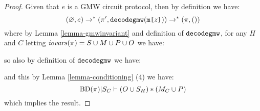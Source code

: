 \begin{proof}
  Given that $e$ is a GMW circuit protocol, then by definition we have:
  $$
  (\varnothing,e) \redxs (\prog',\decodegmw(\mesg{z})) \redxs (\prog,())
  $$
  where by Lemma \ref{lemma-gmwinvariant} and definition of $\decodegmw$,
  for any $H$ and $C$ letting $\iov(\prog) = S \cup M \cup P \cup O$ we
  have:
  \begin{mathpar}

  \end{mathpar}
  so also by definition of $\decodegmw$ we have:
  \begin{mathpar}
    
  \end{mathpar}
  and this by Lemma \ref{lemma-conditioning} (4) we have:
  $$
  \condsep{\progtt(\prog)}{S_C}{(O \cup S_H)}{(M_C \cup P)}
  $$
  which implies the result.
\end{proof}
